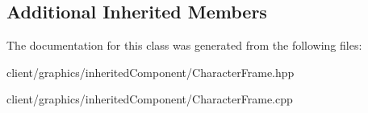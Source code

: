 \subsection*{Additional Inherited Members}


The documentation for this class was generated from the following files\-:\begin{DoxyCompactItemize}
\item 
client/graphics/inherited\-Component/Character\-Frame.\-hpp\item 
client/graphics/inherited\-Component/Character\-Frame.\-cpp\end{DoxyCompactItemize}

